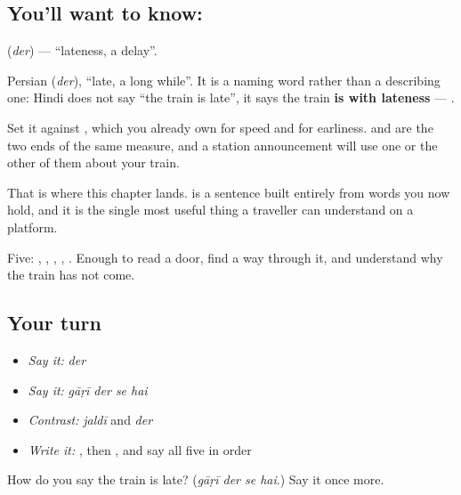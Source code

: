 \subsection*{You'll want to know: }
\textbf{} (\emph{der}) — \textquotedblleft{}lateness, a delay\textquotedblright{}.

Persian  (\emph{der}), \textquotedblleft{}late, a long while\textquotedblright{}. It is a naming word rather than a describing one: Hindi does not say \textquotedblleft{}the train is late\textquotedblright{}, it says the train \textbf{is with lateness} — \textbf{   }.

Set it against \textbf{}, which you already own for speed and for earliness.  and  are the two ends of the same measure, and a station announcement will use one or the other of them about your train.

That is where this chapter lands. \textbf{   } is a sentence built entirely from words you now hold, and it is the single most useful thing a traveller can understand on a platform.

\begin{grammarlens}[title={What you've built}]
Five: , , , , . Enough to read a door, find a way through it, and understand why the train has not come.
\end{grammarlens}

\subsection*{Your turn}
\begin{itemize}
\raggedright
  \item \emph{Say it:} \emph{der}
  \item \emph{Say it:} \emph{gāṛī der se hai}
  \item \emph{Contrast:} \emph{jaldī} and \emph{der}
  \item \emph{Write it:} , then , and say all five in order
\end{itemize}

\begin{tcolorbox}[breakable,colback=teal!4,colframe=teal!35!black,title={Before you move on}]
How do you say the train is late? (\emph{gāṛī der se hai}.) Say it once more.
\end{tcolorbox}
